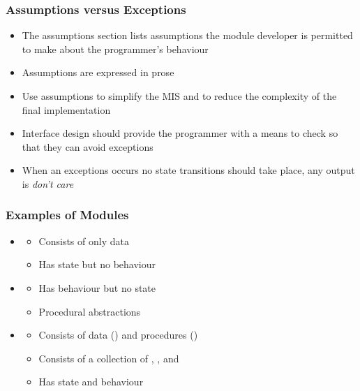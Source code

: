 \documentclass[t, 12pt, numbers, fleqn, handout]{beamer}
\begin{document}

\begin{frame}

\frametitle{Assumptions versus Exceptions}

\begin{itemize}
\item The assumptions section lists assumptions the module developer is permitted to make about the programmer's behaviour
\item Assumptions are expressed in prose
\item Use assumptions to simplify the MIS and to reduce the complexity of the final implementation
\item Interface design should provide the programmer with a means to check so that they can avoid exceptions
\item When an exceptions occurs no state transitions should take place, any output is {\it don't care}
\end{itemize}

\end{frame}


\begin{frame}
\frametitle{Examples of Modules \cite{GhezziEtAl2003}}

\begin{itemize}

\item {}
\begin{itemize}
\item Consists of only data
\item Has state but no behaviour
\end{itemize}
\item {}
\begin{itemize}
\item Has behaviour but no state
\item Procedural abstractions
\end{itemize}
\item {}
\begin{itemize}
\item Consists of data () and procedures ()
\item Consists of a collection of ,
  , and 
\item Has state and behaviour
\end{itemize}
\end{itemize}

\end{frame}
\end{document}

